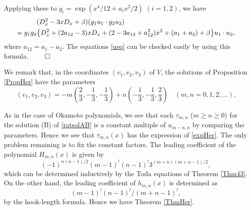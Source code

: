 Applying these to $g_i=\exp(x^4/12+a_i x^2/2)$ $(i=1,2)$, we have 
\begin{align}
&(D_x^2-3x D_x+\beta) (g_1 u_1 \cdot g_2 u_2) \notag \\
=g_1 g_2 &
\big\{D_x^2+(2a_{12}-3)x D_x+
(2-3a_{12}+a_{12}^2)x^2+(a_1+a_2)+\beta
\big\} u_1 \cdot u_2, \notag
\end{align}
where $a_{12}=a_1-a_2$. 
The equations \eqref{ueq} can be checked easily by using this formula. 
$\qed$
%
\par\medskip\noindent
We remark that, in the coordinates $(v_1,v_2,v_3)$ of $V$, 
the solutions of Proposition \ref{PropHer} have the parameters
\begin{equation}
(v_1,v_2,v_3)=-m(\frac{2}{3},-\frac{1}{3},-\frac{1}{3})+
n(-\frac{1}{3},-\frac{1}{3},\frac{2}{3})\quad(m,n= 0,1,2,\ldots). 
\end{equation}
\par\medskip
As in the case of Okamoto polynomials, 
we see that each $\tau_{m,n}$ ($m\ge n \ge 0$) for the solution (B) 
of \eqref{ratsolAB} is a constant multiple of $u_{m-n,n}$ by 
comparing the parameters.  
Hence we see that $\tau_{m,n}(x)$ has the expression 
of \eqref{expHer}. 
The only problem remaining is to fix the constant factors. 
The leading coefficient of the polynomial
$H_{m,n}(x)$ is given by
\begin{equation}
(-1)^{n(n-1)/2} (m-1)^{!} (n-1)^{!} 3^{(m+n)(m+n-1)/2},
\end{equation}
which can be determined inductively by the Toda equations of 
Theorem \ref{Thm43}. 
On the other hand, the leading coefficient of $h_{m,n}(x)$ is determined 
as  
\begin{equation}
(m-1)^! (n-1)^! /(m+n-1)^!, 
\end{equation}
by the hook-length formula. 
Hence we have Theorem \ref{ThmHer}. 
\par\medskip
